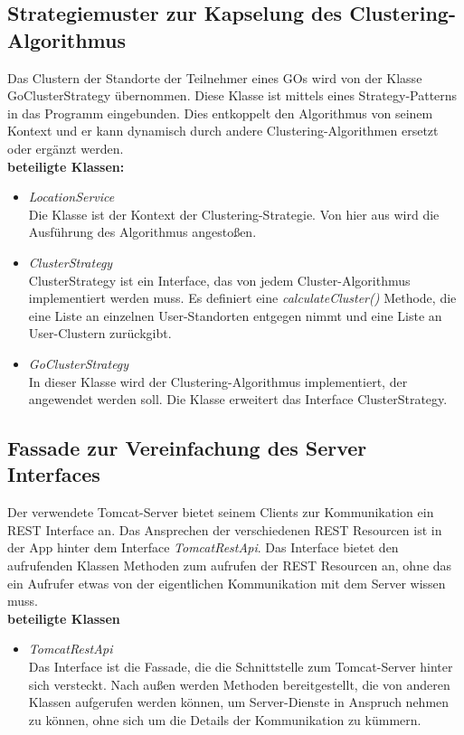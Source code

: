 \documentclass[11pt,a4paper]{article}
\begin{document}
\subsection{Strategiemuster zur Kapselung des Clustering-Algorithmus}
Das Clustern der Standorte der Teilnehmer eines GOs wird von der Klasse GoClusterStrategy übernommen. Diese Klasse ist mittels eines Strategy-Patterns in das Programm eingebunden. Dies entkoppelt den Algorithmus von seinem Kontext und er kann dynamisch durch andere Clustering-Algorithmen ersetzt oder ergänzt werden. \\

\textbf{beteiligte Klassen:}
\begin{itemize}
	\item \textit{LocationService} \\
	Die Klasse ist der Kontext der Clustering-Strategie. Von hier aus wird die Ausführung des Algorithmus angestoßen.
	\item \textit{ClusterStrategy} \\
	ClusterStrategy ist ein Interface, das von jedem Cluster-Algorithmus implementiert werden muss. Es definiert eine \textit{calculateCluster()} Methode, die eine Liste an einzelnen User-Standorten entgegen nimmt und eine Liste an User-Clustern zurückgibt.
	\item \textit{GoClusterStrategy} \\
	In dieser Klasse wird der Clustering-Algorithmus implementiert, der angewendet werden soll. Die Klasse erweitert das Interface ClusterStrategy.
\end{itemize}

\subsection{Fassade zur Vereinfachung des Server Interfaces}
Der verwendete Tomcat-Server bietet seinem Clients zur Kommunikation ein REST Interface an. Das Ansprechen der verschiedenen REST Resourcen ist in der App hinter dem Interface \textit{TomcatRestApi}. Das Interface bietet den aufrufenden Klassen Methoden zum aufrufen der REST Resourcen an, ohne das ein Aufrufer etwas von der eigentlichen Kommunikation mit dem Server wissen muss. \\

\textbf{beteiligte Klassen}
\begin{itemize}
	\item \textit{TomcatRestApi} \\
	Das Interface ist die Fassade, die die Schnittstelle zum Tomcat-Server hinter sich versteckt. Nach außen werden Methoden bereitgestellt, die von anderen Klassen aufgerufen werden können, um Server-Dienste in Anspruch nehmen zu können, ohne sich um die Details der Kommunikation zu kümmern.
\end{itemize}
\end{document}
